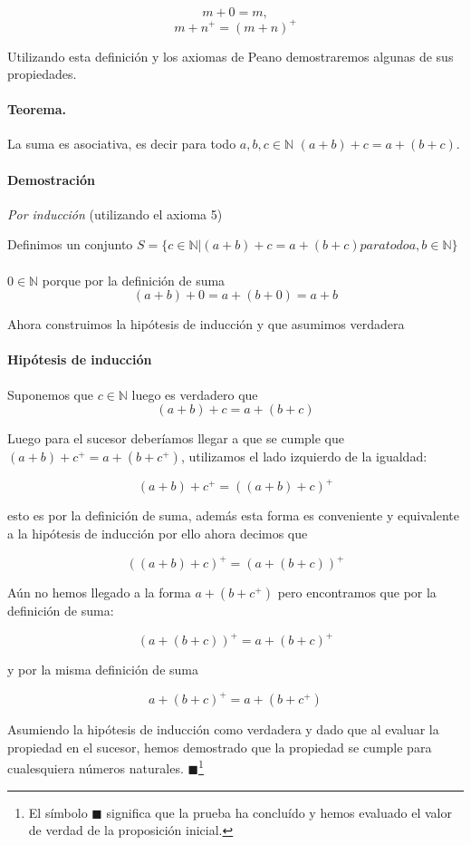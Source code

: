 \documentclass{article}
\begin{document}
$$m + 0 = m,$$
$$m + n^+ = (m + n)^+$$

Utilizando esta definición y los axiomas de Peano demostraremos algunas de sus propiedades.

\paragraph{Teorema.} La suma es asociativa, es decir para todo $a,b,c \in \mathbb{N}$ $(a + b) + c = a + (b + c)$.

\paragraph{Demostración} \textit{Por inducción} (utilizando el axioma 5)

Definimos un conjunto $S = \{c \in \mathbb{N} | (a + b) + c = a + (b + c) para todo a,b \in \mathbb{N}\}$

\paragraph{} $0 \in \mathbb{N}$ porque por la definición de suma
$$ (a + b) + 0 = a + (b + 0) = a + b$$

Ahora construimos la hipótesis de inducción y que asumimos verdadera
\paragraph{Hipótesis de inducción} Suponemos que $c \in \mathbb{N}$ luego es verdadero que 
$$(a + b) + c = a + (b + c)$$

Luego para el sucesor deberíamos llegar a que se cumple que $(a + b) + c^+ = a + (b + c^+)$, utilizamos el lado izquierdo de la igualdad:

    $$(a + b) + c^+ = ((a + b) + c)^+$$

esto es por la definición de suma, además esta forma es conveniente y equivalente a la hipótesis de inducción por ello ahora decimos que

$$((a + b) + c)^+ = (a + (b + c))^+$$

Aún no hemos llegado a la forma $a + (b + c^+)$ pero encontramos que por la definición de suma:

$$(a + (b + c))^+ = a + (b + c)^+$$

y por la misma definición de suma

$$a + (b + c)^+ = a + (b + c^+)$$

Asumiendo la hipótesis de inducción como verdadera y dado que al evaluar la propiedad en el sucesor, hemos demostrado que la propiedad se cumple para cualesquiera números naturales. $\blacksquare$\footnote{El símbolo $\blacksquare$ significa que la prueba ha concluído y hemos evaluado el valor de verdad de la proposición inicial.}
\end{document}
